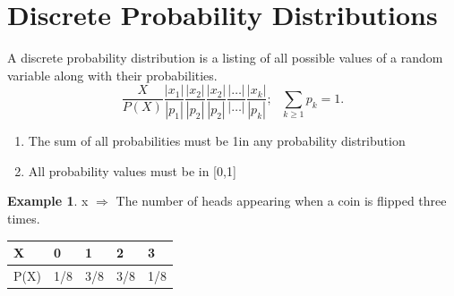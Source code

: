 \documentclass[12pt]{article}
\theoremstyle{definition}
\newtheorem{exmp}{Example}[section]
\begin{document}
 \section{Discrete Probability Distributions}
A discrete probability distribution is a listing of 
all possible values of a random variable along 
with their probabilities. \\
\begin{equation}
    \displaystyle \frac{X}{P(X)} \frac{|x_1|}{|p_1|} \frac{|x_2|}{|p_2|} \frac{|x_2|}{|p_2|} 
    \frac{|\dots|}{|\dots|} \frac{|x_k|}{|p_k|}; \  \ \  \sum _{k \geq 1} p_k = 1.
\end{equation}    
\begin{enumerate}
    \item The sum of all probabilities must be 1in any probability distribution
    \item All probability values must be in [0,1]
\end{enumerate}
\begin{exmp}
    x $\Rightarrow$ The number of heads appearing when a coin is flipped three times.

\end{exmp}
    
\begin{longtable}[c]{lllll}
X    & 0   & 1   & 2   & 3   \\
\endfirsthead
%
\endhead
%
P(X) & 1/8 & 3/8 & 3/8 & 1/8
\end{longtable}
\end{document}
